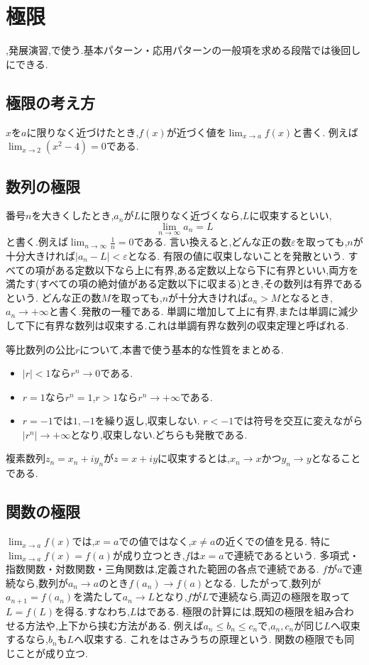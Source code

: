
\section{極限}\label{節：極限}
,発展演習,で使う.基本パターン・応用パターンの一般項を求める段階では後回しにできる.

\subsection{極限の考え方}\label{節：極限の考え方}
$x$を$a$に限りなく近づけたとき,$f(x)$が近づく値を$\lim_{x\to a}f(x)$と書く.
例えば$\lim_{x\to2}(x^2-4)=0$である.

\subsection{数列の極限}\label{節：数列の極限}
番号$n$を大きくしたとき,$a_n$が$L$に限りなく近づくなら,$L$に収束するといい,
\[
  \lim_{n\to\infty}a_n=L
\]
と書く.例えば$\lim_{n\to\infty}\frac{1}{n}=0$である.
言い換えると,どんな正の数$\varepsilon$を取っても,$n$が十分大きければ$|a_n-L|<\varepsilon$となる.
有限の値に収束しないことを発散という.
すべての項がある定数以下なら上に有界,ある定数以上なら下に有界といい,両方を満たす(すべての項の絶対値がある定数以下に収まる)とき,その数列は有界であるという.
どんな正の数$M$を取っても,$n$が十分大きければ$a_n>M$となるとき,$a_n\to+\infty$と書く.発散の一種である.
単調に増加して上に有界,または単調に減少して下に有界な数列は収束する.これは単調有界な数列の収束定理と呼ばれる.

等比数列の公比$r$について,本書で使う基本的な性質をまとめる.
\begin{itemize}
  \item $|r|<1$なら$r^n\to0$である.
  \item $r=1$なら$r^n=1$,$r>1$なら$r^n\to+\infty$である.
  \item $r=-1$では$1,-1$を繰り返し,収束しない.
    $r<-1$では符号を交互に変えながら$|r^n|\to+\infty$となり,収束しない.どちらも発散である.
\end{itemize}
複素数列$z_n=x_n+iy_n$が$z=x+iy$に収束するとは,$x_n\to x$かつ$y_n\to y$となることである.

\subsection{関数の極限}\label{節：関数の極限}
$\lim_{x\to a}f(x)$では,$x=a$での値ではなく,$x\ne a$の近くでの値を見る.
特に$\lim_{x\to a}f(x)=f(a)$が成り立つとき,$f$は$x=a$で連続であるという.
多項式・指数関数・対数関数・三角関数は,定義された範囲の各点で連続である.
$f$が$a$で連続なら,数列が$a_n\to a$のとき$f(a_n)\to f(a)$となる.
したがって,数列が$a_{n+1}=f(a_n)$を満たして$a_n\to L$となり,$f$が$L$で連続なら,両辺の極限を取って$L=f(L)$を得る.すなわち,$L$はである.
極限の計算には,既知の極限を組み合わせる方法や,上下から挟む方法がある.
例えば$a_n\le b_n\le c_n$で,$a_n,c_n$が同じ$L$へ収束するなら,$b_n$も$L$へ収束する.
これをはさみうちの原理という.
関数の極限でも同じことが成り立つ.

